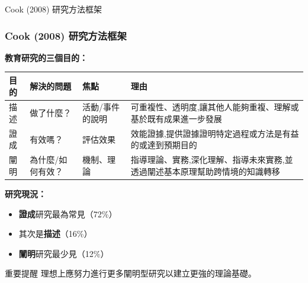 \documentclass[aspectratio=169]{beamer}
\newcommand{\tablesize}{\fontsize{7.5pt}{9pt}\selectfont}
\begin{document}
\begin{frame}{Cook (2008) 研究方法框架}
\frametitle{Cook (2008) 研究方法框架}

\textbf{教育研究的三個目的：}

\begin{table}[h]
\centering
\tablesize
\begin{tabular}{p{1.8cm}p{2.3cm}p{1.8cm}p{4.2cm}}
\toprule
\textbf{目的} & \textbf{解決的問題} & \textbf{焦點} & \textbf{理由} \\
\midrule
描述 & 做了什麼？ & 活動/事件的說明 & 可重複性、透明度,讓其他人能夠重複、理解或基於既有成果進一步發展 \\
\midrule
證成 & 有效嗎？ & 評估效果 & 效能證據,提供證據證明特定過程或方法是有益的或達到預期目的 \\
\midrule
闡明 & 為什麼/如何有效？ & 機制、理論 & 指導理論、實務,深化理解、指導未來實務,並透過闡述基本原理幫助跨情境的知識轉移 \\
\bottomrule
\end{tabular}
\end{table}

\vspace{0.3cm}

\textbf{研究現況：}
\begin{itemize}
    \item \textcolor{ameered}{\textbf{證成}}研究最為常見（72\%）
    \item 其次是\textbf{描述}（16\%）
    \item \textcolor{ameered}{\textbf{闡明}}研究最少見（12\%）
\end{itemize}

\vspace{0.2cm}

\begin{alertblock}{重要提醒}
理想上應努力進行更多闡明型研究以建立更強的理論基礎。
\end{alertblock}
\end{frame}
\end{document}
